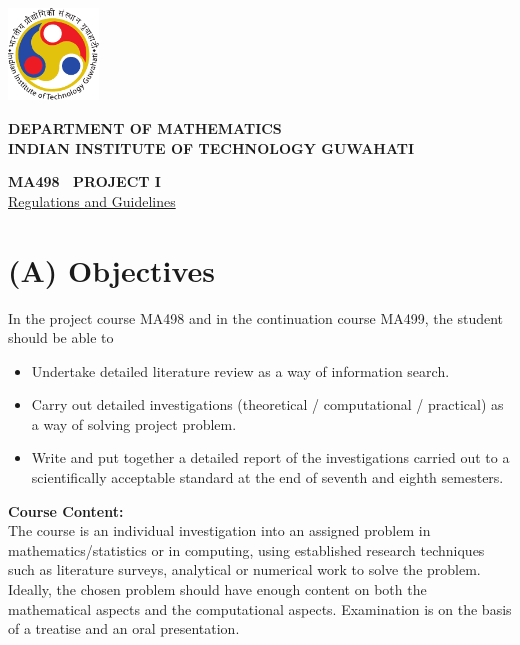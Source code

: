 \documentclass[12pt, a4paper]{article}
\begin{document}

\vspace*{-2cm}

\begin{minipage}{1in}
  \hspace*{-.5cm}
  \includegraphics[width=2.4cm]{iitglogo}
\end{minipage}
\begin{minipage}{5.5in}
  \begin{center}
    {\sf
       {\Large \bf   \textsf{DEPARTMENT OF MATHEMATICS}}  \\
       {\large \bf \textsf{INDIAN INSTITUTE OF TECHNOLOGY GUWAHATI} }  \\
    }
  \end{center}
\end{minipage}

\begin{center}

  {\large\bf MA498 ~PROJECT I} \\
  \underline{\large Regulations and Guidelines}
\end{center}

\section*{(A) Objectives}
In the project course MA498 and in the continuation course MA499, the student
should be able to
\begin{itemize}
\item Undertake detailed literature review as a way of information search.

\item Carry out detailed investigations (theoretical / computational /
  practical) as a way of solving project problem.
\item Write and put together a detailed report of the investigations carried out
  to a scientifically acceptable standard at the end of seventh and eighth
  semesters.
\end{itemize}

{\bf Course Content:}\\
The course is  an individual investigation into an assigned problem in
mathematics/statistics or in computing, using established
research techniques such as literature surveys, analytical
or numerical work to solve the problem.  Ideally, the chosen problem should have enough
content on both the mathematical aspects and the computational aspects.   Examination is on the
basis of a treatise and an  oral presentation.
\end{document}
